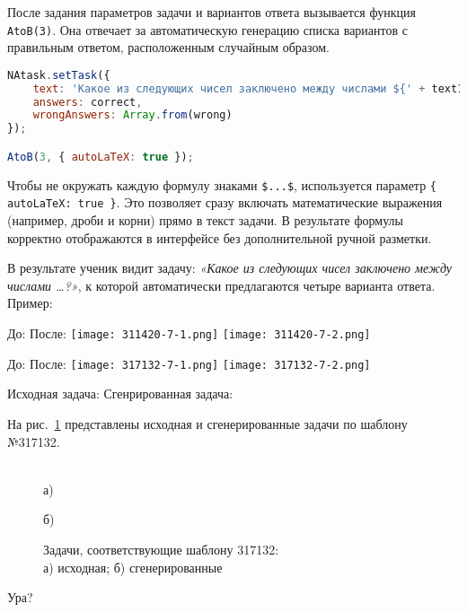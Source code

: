 После задания параметров задачи и вариантов ответа вызывается функция \verb|AtoB(3)|. 
Она отвечает за автоматическую генерацию списка вариантов с правильным ответом, расположенным случайным образом.  

\begin{lstlisting}[language=JavaScript]
NAtask.setTask({
    text: 'Какое из следующих чисел заключено между числами ${' + text1 + '}$ и ${' + text2 + '}$?',
    answers: correct,
    wrongAnswers: Array.from(wrong)
});

AtoB(3, { autoLaTeX: true });
\end{lstlisting}

Чтобы не окружать каждую формулу знаками \verb|$...$|, используется параметр \verb|{ autoLaTeX: true }|. 
Это позволяет сразу включать математические выражения (например, дроби и корни) прямо в текст задачи. 
В результате формулы корректно отображаются в интерфейсе без дополнительной ручной разметки.  

В результате ученик видит задачу: 
\textit{«Какое из следующих чисел заключено между числами …?»}, 
к которой автоматически предлагаются четыре варианта ответа.  
Пример:

 
До:
После:
\texttt{[image: 311420-7-1.png]}
\texttt{[image: 311420-7-2.png]}

 
До:
После:
\texttt{[image: 317132-7-1.png]}
\texttt{[image: 317132-7-2.png]}

Исходная задача:
Сгенрированная задача:




На рис.~\ref{ris:317132} представлены исходная и сгенерированные задачи по шаблону №317132.


\begin{figure}[h]
\begin{minipage}[h]{0.95\linewidth}
 \\а)
\end{minipage}
\vfill
\begin{minipage}[h]{0.95\linewidth}
 б) \\
\end{minipage}
\caption{Задачи, соответствующие шаблону 317132:
\\
а) исходная; б) сгенерированные}
\label{ris:317132}
\end{figure}



Ура?